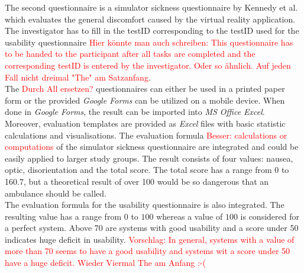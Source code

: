 The second questionnaire is a simulator sickness questionnaire by Kennedy et al. \citep{ssq} which evaluates the general discomfort caused by the virtual reality application. The investigator has to fill in the testID corresponding to the testID used for the usability questionnaire \textcolor{red}{Hier könnte man auch schreiben: This questionnaire has to be handed to the participant after all tasks are completed and the corresponding testID is entered by the investigator. Oder so ähnlich. Auf jeden Fall nicht dreimal "The" am Satzanfang}. \\

The \textcolor{red}{Durch All ersetzen?} questionnaires can either be used in a printed paper form or the provided \textit{Google Forms} can be utilized on a mobile device. When done in \textit{Google Forms}, the result can be imported into \textit{MS Office Excel}. Moreover, evaluation templates are provided as \textit{Excel} files with basic statistic calculations and visualisations. The evaluation formula \textcolor{red}{Besser: calculations or computations} of the simulator sickness questionnaire are integrated and could be easily applied to larger study groups. The result consists of four values: nausea, optic, disorientation and the total score. The total score has a range from 0 to 160.7, but a theoretical result of over 100 would be so dangerous that an ambulance should be called. \\
The evaluation formula for the usability questionnaire is also integrated. The resulting value has a range from $0$ to $100$ whereas a value of $100$ is considered for a perfect system. Above 70 are systems with good usability and a score under 50 indicates huge deficit in usability. \textcolor{red}{Vorschlag: In general, systems with a value of more than 70 seems to have a good usability and systems wit a score under 50 have a huge deficit.} \textcolor{red}{Wieder Viermal The am Anfang :-(}




\newpage
